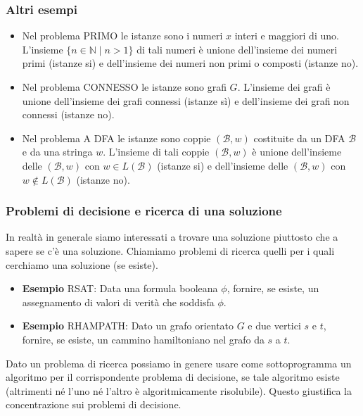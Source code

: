 \subsubsection{Altri esempi}
\begin{itemize}
    \item Nel problema PRIMO le istanze sono i numeri $x$ interi e maggiori di uno.
L'insieme $\{n \in \mathbb{N} \mid n>1\}$ di tali numeri è unione dell'insieme dei numeri primi (istanze si) e dell'insieme dei numeri non primi o composti (istanze no).
    \item Nel problema CONNESSO le istanze sono grafi $G$. L'insieme dei grafi è unione dell'insieme dei grafi connessi (istanze sì) e dell'insieme dei grafi non connessi (istanze no).
    \item Nel problema A DFA le istanze sono coppie $(\mathcal{B}, w)$ costituite da un DFA $\mathcal{B}$ e da una stringa $w$.
L'insieme di tali coppie $(\mathcal{B}, w)$ è unione dell'insieme delle $(\mathcal{B}, w)$ con $w \in L(\mathcal{B})$ (istanze si) e dell'insieme delle $(\mathcal{B}, w)$ con $w \notin L(\mathcal{B})$ (istanze no).
\end{itemize}

\subsubsection{Problemi di decisione e ricerca di una soluzione}

In realtà in generale siamo interessati a trovare una soluzione
piuttosto che a sapere se c'è una soluzione.
Chiamiamo problemi di ricerca quelli per i quali cerchiamo una
soluzione (se esiste).

\begin{itemize}
    \item \textbf{Esempio} 
RSAT: Data una formula booleana $\phi$, fornire, se esiste, un assegnamento di valori di verità che soddisfa $\phi$.
    \item \textbf{Esempio}
RHAMPATH: Dato un grafo orientato $G$ e due vertici $s$ e $t$, fornire, se esiste, un cammino hamiltoniano nel grafo da $s$ a $t$.
\end{itemize}
Dato un problema di ricerca possiamo in genere usare come
sottoprogramma un algoritmo per il corrispondente problema di
decisione, se tale algoritmo esiste (altrimenti né l'uno né l'altro è
algoritmicamente risolubile).
Questo giustifica la concentrazione sui problemi di decisione.

\vspace{5mm}

